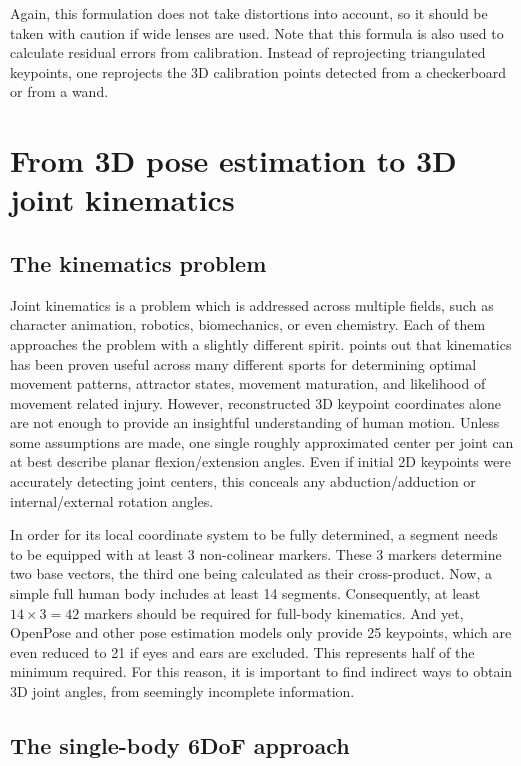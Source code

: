 Again, this formulation does not take distortions into account, so it should be taken with caution if wide lenses are used. Note that this formula is also used to calculate residual errors from calibration. Instead of reprojecting triangulated keypoints, one reprojects the 3D calibration points detected from a checkerboard or from a wand.



\newpage
\section{From 3D pose estimation to 3D joint kinematics}\label{sec:3D joint kin}

\subsection{The kinematics problem}

Joint kinematics is a problem which is addressed across multiple fields, such as character animation, robotics, biomechanics, or even chemistry. Each of them approaches the problem with a slightly different spirit. \cite{Robertson2013} points out that kinematics has been proven useful across many different sports for determining optimal movement patterns, attractor states, movement maturation, and likelihood of movement related injury. However, reconstructed 3D keypoint coordinates alone are not enough to provide an insightful understanding of human motion. Unless some assumptions are made, one single roughly approximated center per joint can at best describe planar flexion/extension angles. Even if initial 2D keypoints were accurately detecting joint centers, this conceals any abduction/adduction or internal/external rotation angles. 

In order for its local coordinate system to be fully determined, a segment needs to be equipped with at least 3 non-colinear markers. These 3 markers determine two base vectors, the third one being calculated as their cross-product. Now, a simple full human body includes at least 14 segments. Consequently, at least $14 \times 3 = 42$ markers should be required for full-body kinematics. And yet, OpenPose and other pose estimation models only provide 25 keypoints, which are even reduced to 21 if eyes and ears are excluded. This represents half of the minimum required. For this reason, it is important to find indirect ways to obtain 3D joint angles, from seemingly incomplete information.


\subsection{The single-body 6DoF approach}

